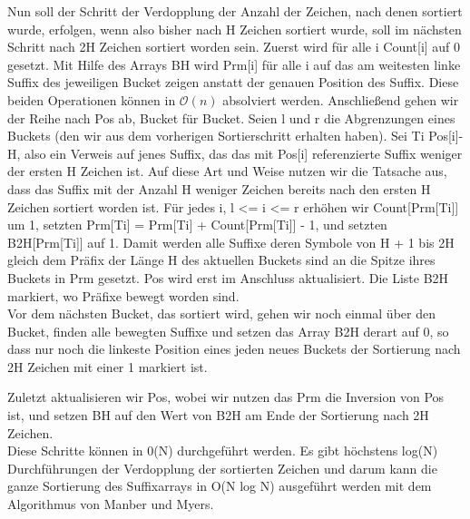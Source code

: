 \documentclass[twoside]{article}
\begin{document}
Nun soll der Schritt der Verdopplung der Anzahl der Zeichen, nach denen sortiert
wurde, erfolgen, wenn also bisher nach H Zeichen sortiert wurde, soll im nächsten
Schritt nach 2H Zeichen sortiert worden sein.
Zuerst wird für alle i Count[i] auf 0 gesetzt. Mit Hilfe des Arrays BH wird Prm[i]
für alle i auf das am weitesten linke Suffix des jeweiligen Bucket zeigen anstatt
der genauen Position des Suffix. Diese beiden Operationen können in $\mathcal{O}(n)$ absolviert werden.
Anschließend gehen wir der Reihe nach Pos ab, Bucket für Bucket. Seien l und r
die Abgrenzungen eines Buckets (den wir aus dem vorherigen Sortierschritt erhalten haben).
Sei Ti Pos[i]-H, also ein Verweis auf jenes Suffix, das das mit Pos[i] referenzierte
Suffix weniger der ersten H Zeichen ist. Auf diese Art und Weise nutzen wir die
Tatsache aus, dass das Suffix mit der Anzahl H weniger Zeichen bereits nach den
ersten H Zeichen sortiert worden ist. Für jedes i, l <= i <= r erhöhen wir Count[Prm[Ti]]
um 1, setzten Prm[Ti] = Prm[Ti] + Count[Prm[Ti]] - 1, und setzten B2H[Prm[Ti]]
auf 1.
Damit werden alle Suffixe deren Symbole von H + 1 bis 2H gleich dem Präfix der
Länge H des aktuellen Buckets sind an die Spitze ihres Buckets in Prm gesetzt.
Pos wird erst im Anschluss aktualisiert. Die Liste B2H markiert, wo Präfixe
bewegt worden sind. \\

Vor dem nächsten Bucket, das sortiert wird, gehen wir noch einmal über den Bucket,
finden alle bewegten Suffixe und setzen das Array B2H derart auf 0, so dass nur
noch die linkeste Position eines jeden neues Buckets der Sortierung nach 2H Zeichen
mit einer 1 markiert ist.

Zuletzt aktualisieren wir Pos, wobei wir nutzen das Prm die Inversion von Pos ist,
und setzen BH auf den Wert von B2H am Ende der Sortierung nach 2H Zeichen. \\

Diese Schritte können in 0(N) durchgeführt werden. Es gibt höchstens log(N)
Durchführungen der Verdopplung der sortierten Zeichen und darum kann die ganze
Sortierung des Suffixarrays in O(N log N) ausgeführt werden mit dem Algorithmus
von Manber und Myers.
\end{document}
